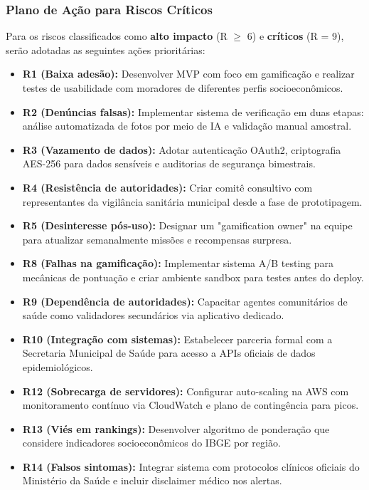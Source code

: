 \documentclass[a5paper, 12pt]{article}
\begin{document}
\newpage
\subsubsection{Plano de Ação para Riscos Críticos}

Para os riscos classificados como \textbf{alto impacto} (R $\geq$ 6) e \textbf{críticos} (R = 9), serão adotadas as seguintes ações prioritárias:

\begin{itemize}
    \item \textbf{R1 (Baixa adesão):} Desenvolver MVP com foco em gamificação e realizar testes de usabilidade com moradores de diferentes perfis socioeconômicos.
    \item \textbf{R2 (Denúncias falsas):} Implementar sistema de verificação em duas etapas: análise automatizada de fotos por meio de IA e validação manual amostral.
    \item \textbf{R3 (Vazamento de dados):} Adotar autenticação OAuth2, criptografia AES-256 para dados sensíveis e auditorias de segurança bimestrais.
    \item \textbf{R4 (Resistência de autoridades):} Criar comitê consultivo com representantes da vigilância sanitária municipal desde a fase de prototipagem.
    \item \textbf{R5 (Desinteresse pós-uso):} Designar um "gamification owner" na equipe para atualizar semanalmente missões e recompensas surpresa.
    \item \textbf{R8 (Falhas na gamificação):} Implementar sistema A/B testing para mecânicas de pontuação e criar ambiente sandbox para testes antes do deploy.
    \item \textbf{R9 (Dependência de autoridades):} Capacitar agentes comunitários de saúde como validadores secundários via aplicativo dedicado.
    \item \textbf{R10 (Integração com sistemas):} Estabelecer parceria formal com a Secretaria Municipal de Saúde para acesso a APIs oficiais de dados epidemiológicos.
    \item \textbf{R12 (Sobrecarga de servidores):} Configurar auto-scaling na AWS com monitoramento contínuo via CloudWatch e plano de contingência para picos.
    \item \textbf{R13 (Viés em rankings):} Desenvolver algoritmo de ponderação que considere indicadores socioeconômicos do IBGE por região.
    \item \textbf{R14 (Falsos sintomas):} Integrar sistema com protocolos clínicos oficiais do Ministério da Saúde e incluir disclaimer médico nos alertas.
\end{itemize}
\end{document}
